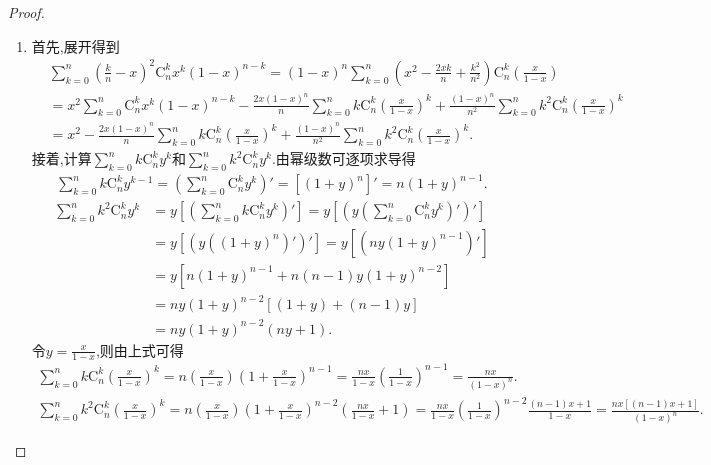 \documentclass[../../main.tex]{subfiles}
\begin{document}
\begin{proof}
\begin{enumerate}
\item 首先,展开得到
\begin{align}
&\sum_{k=0}^n{\left( \frac{k}{n}-x \right) ^2\mathrm{C}_{n}^{k}x^k\left( 1-x \right) ^{n-k}}=\left( 1-x \right) ^n\sum_{k=0}^n{\left( x^2-\frac{2xk}{n}+\frac{k^2}{n^2} \right) \mathrm{C}_{n}^{k}\left( \frac{x}{1-x} \right)}
\nonumber
\\
&=x^2\sum_{k=0}^n{\mathrm{C}_{n}^{k}x^k\left( 1-x \right) ^{n-k}}-\frac{2x\left( 1-x \right) ^n}{n}\sum_{k=0}^n{k\mathrm{C}_{n}^{k}\left( \frac{x}{1-x} \right) ^k}+\frac{\left( 1-x \right) ^n}{n^2}\sum_{k=0}^n{k^2\mathrm{C}_{n}^{k}\left( \frac{x}{1-x} \right) ^k}
\nonumber
\\
&=x^2-\frac{2x\left( 1-x \right) ^n}{n}\sum_{k=0}^n{k\mathrm{C}_{n}^{k}\left( \frac{x}{1-x} \right) ^k}+\frac{\left( 1-x \right) ^n}{n^2}\sum_{k=0}^n{k^2\mathrm{C}_{n}^{k}\left( \frac{x}{1-x} \right) ^k}.\label{equation-2388923747}
\end{align}
接着,计算$\sum_{k=0}^n{k\mathrm{C}_{n}^{k}y^k}$和$\sum_{k=0}^n{k^2\mathrm{C}_{n}^{k}y^k}$.由幂级数可逐项求导得
\begin{gather*}
\sum_{k=0}^n{k\mathrm{C}_{n}^{k}y^{k-1}}=\left( \sum_{k=0}^n{\mathrm{C}_{n}^{k}y^k} \right) ' =\left[ \left( 1+y \right) ^n \right] ' =n\left( 1+y \right) ^{n-1}.
\end{gather*}
\begin{align*}
\sum_{k=0}^n{k^2\mathrm{C}_{n}^{k}y^k}&=y\left[ \left( \sum_{k=0}^n{k\mathrm{C}_{n}^{k}y^k} \right) ' \right] =y\left[ \left( y\left( \sum_{k=0}^n{\mathrm{C}_{n}^{k}y^k} \right) ' \right) ' \right] 
\\
&=y\left[ \left( y\left( \left( 1+y \right) ^n \right) ' \right) ' \right] =y\left[ \left( ny\left( 1+y \right) ^{n-1} \right) ' \right] 
\\
&=y\left[ n\left( 1+y \right) ^{n-1}+n\left( n-1 \right) y\left( 1+y \right) ^{n-2} \right] 
\\
&=ny\left( 1+y \right) ^{n-2}\left[ \left( 1+y \right) +\left( n-1 \right) y \right] 
\\
&=ny\left( 1+y \right) ^{n-2}\left( ny+1 \right) .
\end{align*}
令$y=\frac{x}{1-x}$,则由上式可得
\begin{gather*}
\sum_{k=0}^n{k\mathrm{C}_{n}^{k}\left( \frac{x}{1-x} \right) ^k}=n\left( \frac{x}{1-x} \right) \left( 1+\frac{x}{1-x} \right) ^{n-1}=\frac{nx}{1-x}\left( \frac{1}{1-x} \right) ^{n-1}=\frac{nx}{\left( 1-x \right) ^n}.
\\
\sum_{k=0}^n{k^2\mathrm{C}_{n}^{k}\left( \frac{x}{1-x} \right) ^k}=n\left( \frac{x}{1-x} \right) \left( 1+\frac{x}{1-x} \right) ^{n-2}\left( \frac{nx}{1-x}+1 \right) =\frac{nx}{1-x}\left( \frac{1}{1-x} \right) ^{n-2}\frac{\left( n-1 \right) x+1}{1-x}=\frac{nx\left[ \left( n-1 \right) x+1 \right]}{\left( 1-x \right) ^n}.

\end{gather*}
\end{enumerate}
\end{proof}
\end{document}
